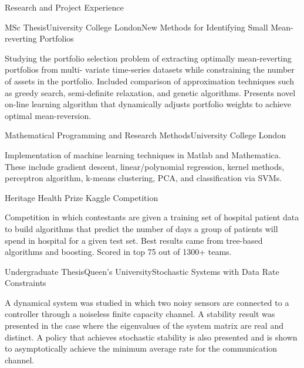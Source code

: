 \documentclass{resume}
\begin{document}
\begin{rSection}{Research and Project Experience}

\begin{rSubsection}{MSc Thesis}{University College London}{New Methods for Identifying Small Mean-reverting Portfolios}{}
\item Studying the portfolio selection problem of extracting optimally mean-reverting portfolios from multi-
variate time-series datasets while constraining the number of assets in the portfolio. Included comparison of approximation techniques such as greedy search, semi-definite relaxation, and genetic algorithms.
Presents novel on-line learning algorithm that dynamically adjusts portfolio weights to achieve optimal
mean-reversion.
\end{rSubsection}

\begin{rSubsection}{Mathematical Programming and Research Methods}{University College London}{}{}
\item Implementation of machine learning techniques in Matlab and Mathematica. These include gradient
descent, linear/polynomial regression, kernel methods, perceptron algorithm, k-means clustering, PCA,
and classification via SVMs.
\end{rSubsection}

\begin{rSubsection}{Heritage Health Prize Kaggle Competition}{}{}{}
\item Competition in which contestants are given a training set of hospital patient data to build algorithms
that predict the number of days a group of patients will spend in hospital for a given test set. Best
results came from tree-based algorithms and boosting. Scored in top 75 out of 1300+ teams.
\end{rSubsection}

\begin{rSubsection}{Undergraduate Thesis}{Queen's University}{Stochastic Systems with Data Rate Constraints}{}
\item A dynamical system was studied in which two noisy sensors are connected to a controller through a
noiseless finite capacity channel. A stability result was presented in the case where the eigenvalues of
the system matrix are real and distinct. A policy that achieves stochastic stability is also presented
and is shown to asymptotically achieve the minimum average rate for the communication channel. \\
\end{rSubsection}

\end{rSection}
\end{document}
